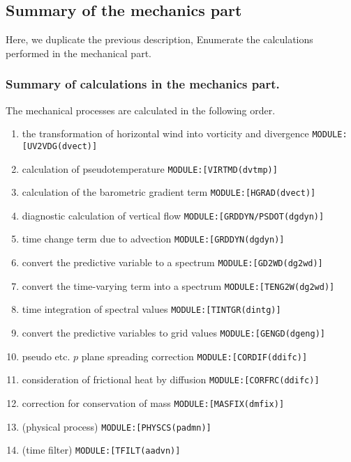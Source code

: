 \hypertarget{summary-of-the-mechanics-part}{%
\subsection{Summary of the mechanics
part}\label{summary-of-the-mechanics-part}}

Here, we duplicate the previous description, Enumerate the calculations
performed in the mechanical part.

\hypertarget{summary-of-calculations-in-the-mechanics-part.}{%
\subsubsection{Summary of calculations in the mechanics
part.}\label{summary-of-calculations-in-the-mechanics-part.}}

The mechanical processes are calculated in the following order.

\begin{enumerate}
\def\labelenumi{\arabic{enumi}.}
\item
  the transformation of horizontal wind into vorticity and divergence
  \texttt{MODULE:{[}UV2VDG(dvect){]}}
\item
  calculation of pseudotemperature \texttt{MODULE:{[}VIRTMD(dvtmp){]}}
\item
  calculation of the barometric gradient term
  \texttt{MODULE:{[}HGRAD(dvect){]}}
\item
  diagnostic calculation of vertical flow
  \texttt{MODULE:{[}GRDDYN/PSDOT(dgdyn){]}}
\item
  time change term due to advection \texttt{MODULE:{[}GRDDYN(dgdyn){]}}
\item
  convert the predictive variable to a spectrum
  \texttt{MODULE:{[}GD2WD(dg2wd){]}}
\item
  convert the time-varying term into a spectrum
  \texttt{MODULE:{[}TENG2W(dg2wd){]}}
\item
  time integration of spectral values
  \texttt{MODULE:{[}TINTGR(dintg){]}}
\item
  convert the predictive variables to grid values
  \texttt{MODULE:{[}GENGD(dgeng){]}}
\item
  pseudo etc. \(p\) plane spreading correction
  \texttt{MODULE:{[}CORDIF(ddifc){]}}
\item
  consideration of frictional heat by diffusion
  \texttt{MODULE:{[}CORFRC(ddifc){]}}
\item
  correction for conservation of mass
  \texttt{MODULE:{[}MASFIX(dmfix){]}}
\item
  (physical process) \texttt{MODULE:{[}PHYSCS(padmn){]}}
\item
  (time filter) \texttt{MODULE:{[}TFILT(aadvn){]}}
\end{enumerate}

